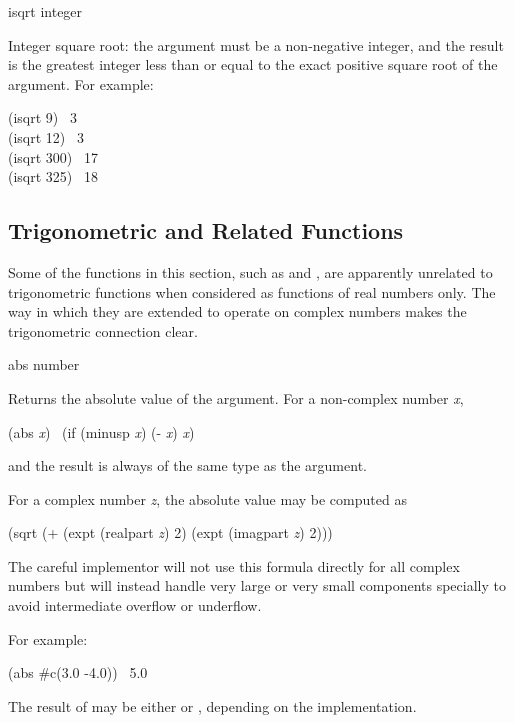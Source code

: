 \begin{defun}[Function]
isqrt integer

Integer square root: the argument must be a non-negative integer, and the
result is the greatest integer less than or equal to the exact positive
square root of the argument.
For example:
\begin{lisp}
(isqrt 9) \EV\ 3 \\
(isqrt 12) \EV\ 3 \\
(isqrt 300) \EV\ 17 \\
(isqrt 325) \EV\ 18
\end{lisp}
\end{defun}

\subsection{Trigonometric and Related Functions}

Some of the functions in this section, such as 
and , are apparently unrelated
to trigonometric functions when considered as functions of
real numbers only.  The way in which they are extended to
operate on complex numbers makes the trigonometric connection clear.

\begin{defun}[Function]
abs number

Returns the absolute value of the argument.  For a non-complex number {\it x},
\begin{lisp}
(abs {\it x}) \EQ\ (if (minusp {\it x}) (- {\it x}) {\it x})
\end{lisp}
and the result is always of the same type as the argument.

For a complex number {\it z}, the absolute value may be computed as
\begin{lisp}
(sqrt (+ (expt (realpart {\it z}) 2) (expt (imagpart {\it z}) 2)))
\end{lisp}

\beforenoterule
\begin{implementation}
The careful implementor will not use this formula directly
for all complex numbers
but will instead handle very large or very small components specially
to avoid intermediate overflow or underflow.
\end{implementation}
\afternoterule

For example:
\begin{lisp}
(abs \#c(3.0 -4.0)) \EV\ 5.0
\end{lisp}
The result of  may be either  or ,
depending on the implementation.
\end{defun}

